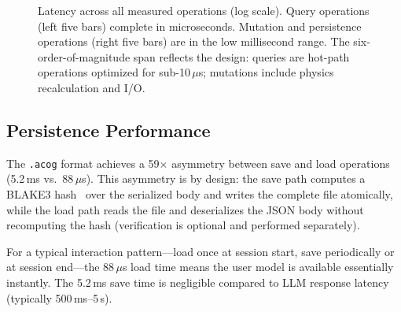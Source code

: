 \documentclass[10pt, twocolumn]{article}
\begin{document}
\begin{figure}[t]
\centering
{}
\caption{Latency across all measured operations (log scale). Query operations (left five bars) complete in microseconds. Mutation and persistence operations (right five bars) are in the low millisecond range. The six-order-of-magnitude span reflects the design: queries are hot-path operations optimized for sub-10\,$\mu$s; mutations include physics recalculation and I/O.}
\label{fig:latency}
\end{figure}

\subsection{Persistence Performance}
\label{sec:persistence}

The \texttt{.acog} format achieves a 59$\times$ asymmetry between save and load operations (5.2\,ms vs.\ 88\,$\mu$s). This asymmetry is by design: the save path computes a BLAKE3 hash~\cite{blake3} over the serialized body and writes the complete file atomically, while the load path reads the file and deserializes the JSON body without recomputing the hash (verification is optional and performed separately).

For a typical interaction pattern---load once at session start, save periodically or at session end---the 88\,$\mu$s load time means the user model is available essentially instantly. The 5.2\,ms save time is negligible compared to LLM response latency (typically 500\,ms--5\,s).
\end{document}
